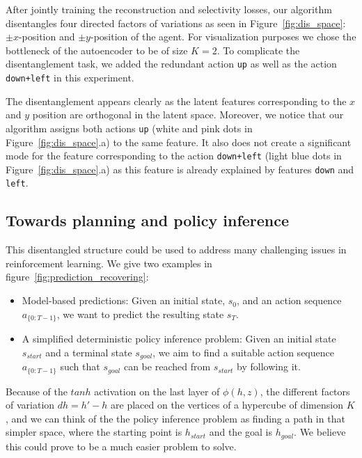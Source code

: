 
After jointly training the reconstruction and selectivity losses, our algorithm disentangles four directed factors of variations as seen in Figure~\ref{fig:dis_space}: $\pm x$-position and $\pm y$-position of the agent. For visualization purposes we chose the bottleneck of the autoencoder to be of size $K = 2$.
To complicate the disentanglement task, we added the redundant action \texttt{up} as well as the action \texttt{down+left} in this experiment.

The disentanglement appears clearly as the latent features corresponding to the $x$ and $y$ position are orthogonal in the latent space. Moreover, we notice that our algorithm assigns both actions \texttt{up} (white and pink dots in Figure~\ref{fig:dis_space}.a) to the same feature. It also does not create a significant mode for the feature corresponding to the action \texttt{down+left} (light blue dots in Figure~\ref{fig:dis_space}.a) as this feature is already explained by features \texttt{down} and \texttt{left}.



\subsection{Towards planning and policy inference}
\label{sec:exp-mb-ppi}

This disentangled structure could be used to address many challenging issues in reinforcement learning. We give two examples in figure~\ref{fig:prediction_recovering}: 
\begin{itemize}
\item Model-based predictions: Given an initial state, $s_0$, and an action sequence $a_{\{0:T-1\}}$, %
we want to predict the resulting state $s_T$.

\item A simplified deterministic policy inference problem: Given an initial state $s_{start}$ and a terminal state $s_{goal}$, we aim to find a suitable action sequence $a_{\{0:T-1\}}$ such that $s_{goal}$ can be reached from $s_{start}$ by following it.
\end{itemize}
Because of the $tanh$ activation on the last layer of $\phi(h, z)$, the different factors of variation $dh = h' - h$ are placed on the vertices of a hypercube of dimension $K$, and we can think of the the policy inference problem as finding a path in that simpler space, where the starting point is $h_{start}$ and the goal is $h_{goal}$. We believe this could prove to be a much easier problem to solve.

